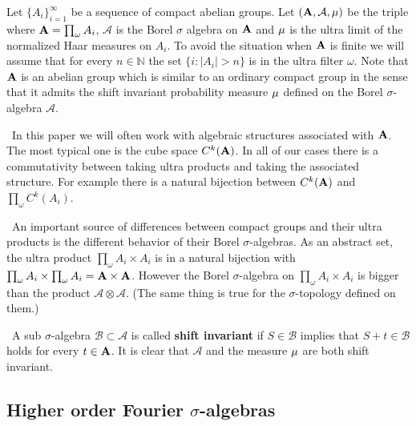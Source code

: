 \documentclass [11pt] {article}
\def\bA{{\bf A}}
\def\bm{{\bf \mu}}
\begin{document}
Let $\{A_i\}_{i=1}^\infty$ be a sequence of compact abelian groups. Let $(\bA,\mathcal{A},\bm)$ be the triple where $\bA=\prod_\omega A_i$, $\mathcal{A}$ is the Borel $\sigma$ algebra on $\bA$ and $\bm$ is the ultra limit of the normalized Haar measures on $A_i$.
To avoid the situation when $\bA$ is finite we will assume that for every $n\in\mathbb{N}$ the set $\{i:|A_i|>n\}$ is in the ultra filter $\omega$. 
Note that $\bA$ is an abelian group which is similar to an ordinary compact group in the sense that it admits the shift invariant probability measure $\bm$ defined on the Borel $\sigma$-algebra $\mathcal{A}$. 

\medskip

~In this paper we will often work with algebraic structures associated with $\bA$. The most typical one is the cube space $C^k(\bA)$. In all of our cases there is a commutativity between taking ultra products and taking the associated structure. For example there is a natural bijection between $C^k(\bA)$ and $\prod_\omega C^k(A_i)$.

\medskip

~An important source of differences between compact groups and their ultra products is the different behavior of their Borel $\sigma$-algebras. As an abstract set, the ultra product $\prod_\omega A_i\times A_i$ is in a natural bijection with $\prod_\omega A_i\times\prod_\omega A_i=\bA\times\bA$.
However the Borel $\sigma$-algebra on $\prod_\omega A_i\times A_i$ is bigger than the product $\mathcal{A}\otimes\mathcal{A}$.  (The same thing is true for the $\sigma$-topology defined on them.)

\medskip

~A sub $\sigma$-algebra $\mathcal{B}\subset\mathcal{A}$ is called {\bf shift invariant} if $S\in\mathcal{B}$ implies that $S+t\in\mathcal{B}$ holds for every $t\in\bA$. It is clear that $\mathcal{A}$ and the measure $\bm$ are both shift invariant.


\subsection{Higher order Fourier $\sigma$-algebras}
\end{document}
